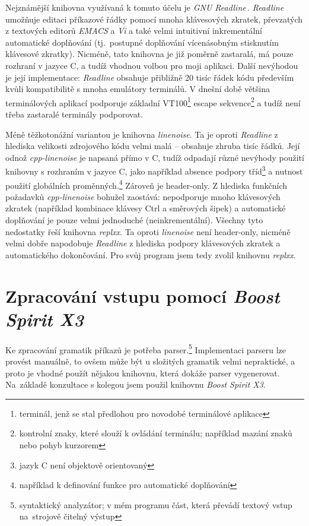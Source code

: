 \documentclass[thesis=B,czech,hidelinks]{FITthesis}[2019/03/06]
\newcommand{\Rplus}{\protect\hspace{-.1em}\protect\raisebox{.35ex}{\smaller{\smaller\textbf{+}}}}
\newcommand{\Cpp}{\mbox{C\Rplus\Rplus}\xspace}
\begin{document}
Nejznámější knihovna využívaná k tomuto účelu je \textit{GNU Readline}\,\cite{readline}. \textit{Readline} umožňuje editaci příkazové řádky pomocí mnoha klávesových zkratek, převzatých z textových editorů \textit{EMACS} a \textit{Vi} a také velmi intuitivní inkrementální automatické doplňování (tj.\ postupné doplňování vícenásobným stisknutím klávesové zkratky). Nicméně, tato knihovna je již poměrně zastaralá, má pouze rozhraní v jazyce C, a tudíž vhodnou volbou pro moji aplikaci. Další nevýhodou je její implementace: \textit{Readline} obsahuje přibližně 20 tisíc řádek kódu především kvůli kompatibilitě s mnoha emulátory terminálů. V dnešní době většina terminálových aplikací podporuje základní VT100\footnote{terminál, jenž se stal předlohou pro novodobé terminálové aplikace} escape sekvence\footnote{kontrolní znaky, které slouží k ovládání terminálu; například mazání znaků nebo pohyb kurzorem} a tudíž není třeba zastaralé terminály podporovat.\cite{linenoise-readme}

Méně těžkotonážní variantou je knihovna \textit{linenoise}. Ta je oproti \textit{Readline} z hlediska velikosti zdrojového kódu velmi malá -- obsahuje zhruba tisíc řádků. Její odnož \textit{cpp-linenoise} je napsaná přímo v \Cpp{}, tudíž odpadají různé nevýhody použití knihovny s rozhraním v jazyce C, jako například absence podpory tříd\footnote{jazyk C není objektově orientovaný} a nutnost použití globálních proměnných.\footnote{například k definování funkce pro automatické doplňování} Zároveň je header-only. Z hlediska funkčních požadavků \textit{cpp-linenoise} bohužel zaostává: nepodporuje mnoho klávesových zkratek (například kombinace klávesy Ctrl a směrových šipek) a automatické doplňování je pouze velmi jednoduché (neinkrementální). Všechny tyto nedostatky řeší knihovna \textit{replxx}. Ta oproti \textit{linenoise} není header-only, nicméně velmi dobře napodobuje \textit{Readline} z hlediska podpory klávesových zkratek a automatického dokončování. Pro svůj program jsem tedy zvolil knihovnu \textit{replxx}.

\section{Zpracování vstupu pomocí \textit{Boost Spirit X3}}\label{spirit:intro}
Ke zpracování gramatik příkazů je potřeba parser.\footnote{syntaktický analyzátor; v mém programu část, která převádí textový vstup na~strojově čitelný výstup} Implementaci parseru lze provést manuálně, to ovšem může být u složitých gramatik velmi nepraktické, a proto je vhodné použít nějakou knihovnu, která dokáže parser vygenerovat. Na~základě konzultace s kolegou jsem použil knihovnu \textit{Boost Spirit X3}.
\end{document}
